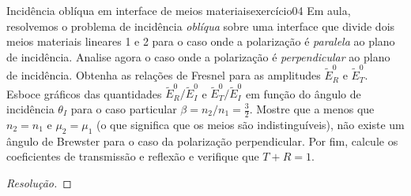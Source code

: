 \begin{exercício}{Incidência oblíqua em interface de meios materiais}{exercício04}
    Em aula, resolvemos o problema de incidência \emph{oblíqua} sobre uma interface que divide dois meios materiais lineares 1 e 2 para o caso onde a polarização é \emph{paralela} ao plano de incidência. Analise agora o caso onde a polarização é \emph{perpendicular} ao plano de incidência. Obtenha as relações de Fresnel para as amplitudes \(\tilde{E}_R^0\) e \(\tilde{E}_T^0\). Esboce gráficos das quantidades \(\tilde{E}_R^0/\tilde{E}_I^0\) e \(\tilde{E}_T^0/\tilde{E}_I^0\) em função do ângulo  de incidência \(\theta_I\) para o caso particular \(\beta = n_2/n_1 = \frac32\). Mostre que a menos que \(n_2 = n_1\) e \(\mu_2 = \mu_1\) (o que significa que os meios são indistinguíveis), não existe um ângulo de Brewster para o caso da polarização perpendicular. Por fim, calcule os coeficientes de transmissão e reflexão e verifique que \(T + R = 1\).
\end{exercício}
\begin{proof}[Resolução]

\end{proof}
